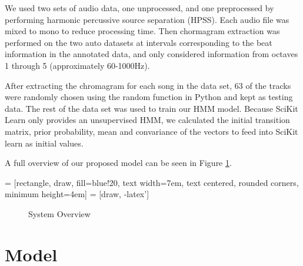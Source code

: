 \documentclass{article}
\begin{document}
We used two sets of audio data, one unprocessed, and one preprocessed by
performing harmonic percussive source separation (HPSS). Each audio file was
mixed to mono to reduce processing time. Then chormagram extraction was
performed on the two auto datasets at intervals corresponding to the beat
information in the annotated data, and only considered information from octaves
1 through 5 (approximately 60-1000Hz).

After extracting the chromagram for each song in the data set, 63 of the tracks
were randomly chosen using the random function in Python and kept as testing
data. The rest of the data set was used to train our HMM model. Because SciKit
Learn only provides an unsupervised HMM, we calculated the initial transition
matrix, prior probability, mean and convariance of the vectors to feed into
SciKit learn as initial values.

A full overview of our proposed model can be seen in Figure \ref{fig:overview}.

 = [rectangle, draw, fill=blue!20,
    text width=7em, text centered, rounded corners, minimum height=4em]
 = [draw, -latex']

\begin{figure}
\caption{System Overview}
\label{fig:overview}
\end{figure}

\section{Model}
\end{document}
